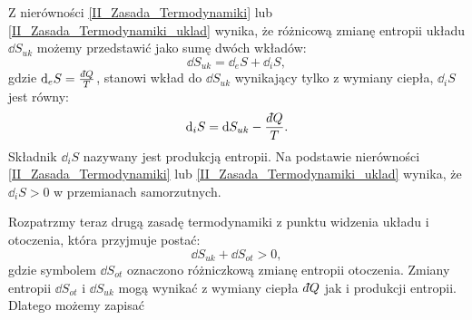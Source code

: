\documentclass[10pt, a4paper, twoside, onecolumn]{article}
\numberwithin{equation}{section}
\newcommand{\dbar}{d\hspace*{-0.08em}\bar{}\hspace*{0.1em}}
\begin{document}
	Z nierówności \eqref{II_Zasada_Termodynamiki} lub \eqref{II_Zasada_Termodynamiki_uklad} wynika, że różnicową zmianę entropii układu \(\dd{S_{uk}}\) możemy przedstawić jako sumę dwóch wkładów:
	\begin{equation}
		\dd{S_{uk}}=\dd_{e}S+\dd_{i}S,
	\end{equation}
	gdzie \(\dd_{e}S=\frac{\dbar Q}{T}\), stanowi wkład do \(\dd{S_{uk}}\) wynikający tylko z wymiany ciepła, \(\dd_{i}S\) jest równy:
	\begin{equation}
		\dd_{i}S=\dd{S_{uk}}-\frac{\dbar Q}{T}.
	\end{equation}
	Składnik \(\dd_{i}S\) nazywany jest produkcją entropii. Na podstawie nierówności \eqref{II_Zasada_Termodynamiki} lub \eqref{II_Zasada_Termodynamiki_uklad} wynika, że \(\dd_{i}S>0\) w przemianach samorzutnych. \par
	Rozpatrzmy teraz drugą zasadę termodynamiki z punktu widzenia układu i otoczenia, która przyjmuje postać:
	\begin{equation}\label{II_Zasada_Termodynamiki_uklad_i_otoczenie}
		\dd{S_{uk}}+\dd{S_{ot}}>0,
	\end{equation}
	gdzie symbolem \(\dd{S_{ot}}\) oznaczono różniczkową zmianę entropii otoczenia. Zmiany entropii \(\dd{S_{ot}}\) i \(\dd{S_{uk}}\) mogą wynikać z wymiany ciepła \(\dbar Q\) jak i produkcji entropii. Dlatego możemy zapisać
	
\end{document}

